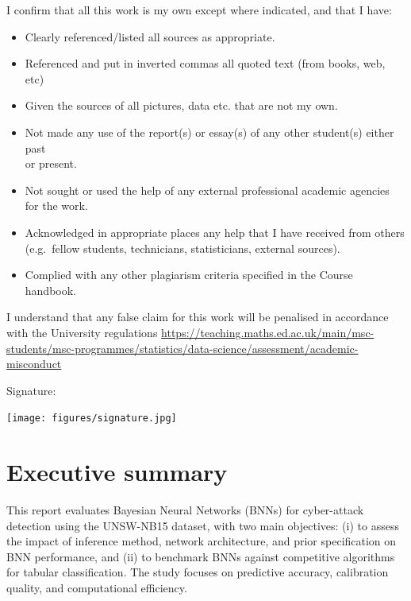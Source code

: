 \documentclass[
  a4paper,
]{scrreprt}
\providecommand{\tightlist}{%
  \setlength{\itemsep}{0pt}\setlength{\parskip}{0pt}}
\begin{document}
I confirm that all this work is my own except where indicated, and that
I have:

\begin{itemize}
\tightlist
\item
  Clearly referenced/listed all sources as appropriate.\\
\item
  Referenced and put in inverted commas all quoted text (from books,
  web, etc)\\
\item
  Given the sources of all pictures, data etc. that are not my own.\\
\item
  Not made any use of the report(s) or essay(s) of any other student(s)
  either past\\
  or present.
\item
  Not sought or used the help of any external professional academic
  agencies for the work.
\item
  Acknowledged in appropriate places any help that I have received from
  others (e.g.~fellow students, technicians, statisticians, external
  sources).
\item
  Complied with any other plagiarism criteria specified in the Course
  handbook.
\end{itemize}

I understand that any false claim for this work will be penalised in
accordance with the University regulations
\url{https://teaching.maths.ed.ac.uk/main/msc-students/msc-programmes/statistics/data-science/assessment/academic-misconduct}

Signature:

\texttt{[image: figures/signature.jpg]}


\chapter*{Executive summary}\label{executive-summary}


This report evaluates Bayesian Neural Networks (BNNs) for cyber-attack
detection using the UNSW-NB15 dataset, with two main objectives: (i) to
assess the impact of inference method, network architecture, and prior
specification on BNN performance, and (ii) to benchmark BNNs against
competitive algorithms for tabular classification. The study focuses on
predictive accuracy, calibration quality, and computational efficiency.
\end{document}
